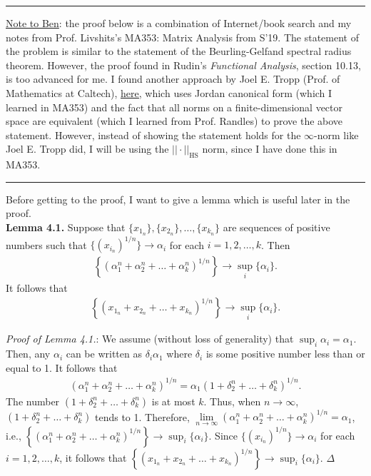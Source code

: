 \documentclass{article}
\begin{document}
\hrule
$\,$\\
\noindent \underline{Note to Ben}: the proof below is a combination of Internet/book search and my notes from Prof. Livshits's MA353: Matrix Analysis from S'19. The statement of the problem is similar to the statement of the Beurling-Gelfand spectral radius theorem. However, the proof found in Rudin's \textit{Functional Analysis}, section 10.13, is too advanced for me. I found another approach by Joel E. Tropp (Prof. of Mathematics at Caltech),  \href{https://pdfs.semanticscholar.org/0bb8/67b2a2cc8e2711bc3273e21db5acdbc06e4d.pdf}{\underline{here}}, which uses Jordan canonical form (which I learned in MA353) and the fact that all norms on a finite-dimensional vector space are equivalent (which I learned from Prof. Randles) to prove the above statement. However, instead of showing the statement holds for the $\infty$-norm like Joel E. Tropp did, I will be using the $||\cdot||_{\text{HS}}$ norm, since I have done this in MA353.  \\  

\hrule
$\,$\\




\noindent Before getting to the proof, I want to give a lemma which is useful later in the proof.\\


\noindent \textbf{Lemma 4.1.} Suppose that $\{x_{1_n} \}, \{x_{2_n}\}, \dots, \{x_{k_n}\}$ are sequences of positive numbers such that $ \{(x_{i_n})^{1/n}\} \to \alpha_i$ for each $i=1,2,\dots,k$. Then 
\begin{align*}
\left\{ (\alpha_1^n+ \alpha_2^n+ \dots + \alpha_k^n)^{1/n} \right\} \to \sup_{i}\{\alpha_i\}.
\end{align*} 
It follows that
\begin{align*}
\left\{ (x_{1_n}+ x_{2_n}+ \dots + x_{k_n})^{1/n} \right\} \to \sup_{i}\{\alpha_i \}.
\end{align*}
 
\noindent \textit{Proof of Lemma 4.1.}: We assume (without loss of generality) that $\sup_{i} \alpha_i = \alpha_1$. Then, any $\alpha_i$ can be written as $\delta_i \alpha_1$ where $\delta_i$ is some positive number less than or equal to 1. It follows that
\begin{align*}
(\alpha_1^n+ \alpha_2^n+ \dots + \alpha_k^n)^{1/n} = \alpha_1 (1 + \delta_2^n + \dots + \delta_k^n)^{1/n}.
\end{align*}
The number $(1 + \delta_2^n + \dots + \delta_k^n)$ is at most $k$. Thus, when $n\to \infty$, $(1 + \delta_2^n + \dots + \delta_k^n)$ tends to 1. Therefore, $\lim\limits_{n\to\infty} (\alpha_1^n+ \alpha_2^n+ \dots + \alpha_k^n)^{1/n} = \alpha_1 $, i.e., $
\left\{ (\alpha_1^n+ \alpha_2^n+ \dots + \alpha_k^n)^{1/n} \right\} \to \sup_{i}\{\alpha_i\}$. Since $ \{(x_{i_n})^{1/n}\} \to \alpha_i$ for each $i=1,2,\dots,k$, it follows that $\left\{ (x_{1_n}+ x_{2_n}+ \dots + x_{k_n})^{1/n} \right\} \to \sup_{i}\{\alpha_i \}$. \hfill $\Delta$\\
\end{document}
